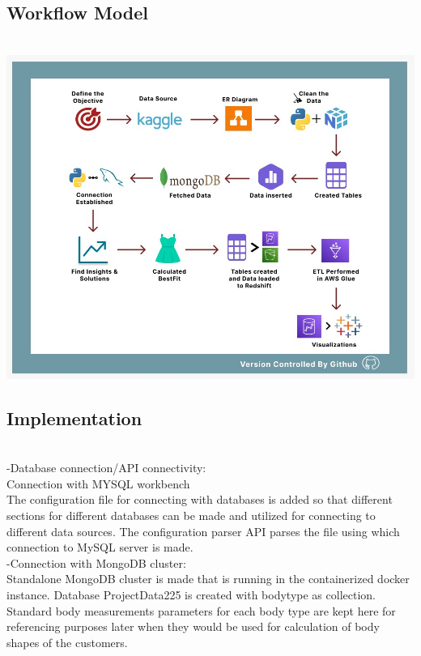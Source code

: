 \documentclass[11pt,journal,compsoc]{IEEEtran}
\begin{document}
\subsection{Workflow Model} \\
    \includegraphics[scale=0.23]{images/workflow_hs.jpeg} \\

\subsection{Implementation} \\

-Database connection/API connectivity: \\
Connection with MYSQL workbench \\
The configuration file for connecting with databases is added so that different sections for different databases can be made and utilized for connecting to different data sources.
The configuration parser API parses the file using which connection to MySQL server is made.  \\

-Connection with MongoDB cluster: \\
Standalone MongoDB cluster is made that is running in the containerized docker instance. Database ProjectData225 is created with bodytype as collection. Standard body measurements parameters for each body type are kept here for referencing  purposes later when they would be used for calculation of body shapes of the customers. \\
\end{document}
